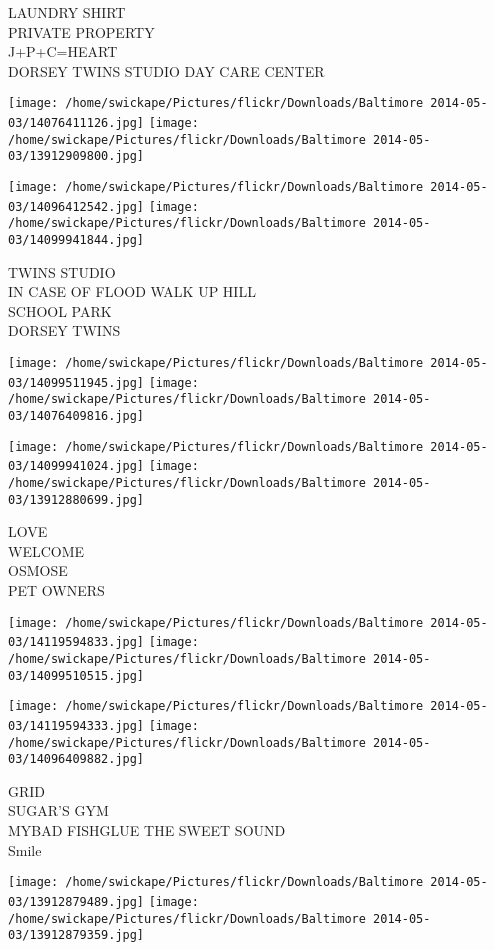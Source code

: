 \documentclass[10pt,letterpaper]{article}
\begin{document}
LAUNDRY SHIRT\\
PRIVATE PROPERTY\\
J+P+C=HEART\\
DORSEY TWINS STUDIO DAY CARE CENTER
\pagebreak

\texttt{[image: /home/swickape/Pictures/flickr/Downloads/Baltimore 2014-05-03/14076411126.jpg]}
\texttt{[image: /home/swickape/Pictures/flickr/Downloads/Baltimore 2014-05-03/13912909800.jpg]}

\texttt{[image: /home/swickape/Pictures/flickr/Downloads/Baltimore 2014-05-03/14096412542.jpg]}
\texttt{[image: /home/swickape/Pictures/flickr/Downloads/Baltimore 2014-05-03/14099941844.jpg]}

TWINS STUDIO\\
IN CASE OF FLOOD WALK UP HILL\\
SCHOOL PARK\\
DORSEY TWINS
\pagebreak

\texttt{[image: /home/swickape/Pictures/flickr/Downloads/Baltimore 2014-05-03/14099511945.jpg]}
\texttt{[image: /home/swickape/Pictures/flickr/Downloads/Baltimore 2014-05-03/14076409816.jpg]}

\texttt{[image: /home/swickape/Pictures/flickr/Downloads/Baltimore 2014-05-03/14099941024.jpg]}
\texttt{[image: /home/swickape/Pictures/flickr/Downloads/Baltimore 2014-05-03/13912880699.jpg]}

LOVE\\
WELCOME\\
OSMOSE\\
PET OWNERS
\pagebreak

\texttt{[image: /home/swickape/Pictures/flickr/Downloads/Baltimore 2014-05-03/14119594833.jpg]}
\texttt{[image: /home/swickape/Pictures/flickr/Downloads/Baltimore 2014-05-03/14099510515.jpg]}

\texttt{[image: /home/swickape/Pictures/flickr/Downloads/Baltimore 2014-05-03/14119594333.jpg]}
\texttt{[image: /home/swickape/Pictures/flickr/Downloads/Baltimore 2014-05-03/14096409882.jpg]}

GRID\\
SUGAR'S GYM\\
MYBAD FISHGLUE THE SWEET SOUND\\
Smile
\pagebreak

\texttt{[image: /home/swickape/Pictures/flickr/Downloads/Baltimore 2014-05-03/13912879489.jpg]}
\texttt{[image: /home/swickape/Pictures/flickr/Downloads/Baltimore 2014-05-03/13912879359.jpg]}
\end{document}
